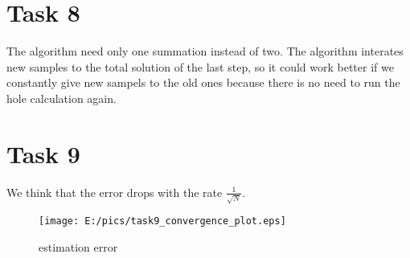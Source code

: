 \documentclass{article}
\begin{document}
\section{Task 8}
The algorithm need only one summation instead of two. The algorithm interates new samples to the total solution of the last step, so it could work better if we constantly give new sampels to the old ones because there is no need to run the hole calculation again. 

\section{Task 9}
We think that the error drops with the rate $\frac{1}{\sqrt{N}}$.
\begin{figure}[htbp]
	\centering
		\texttt{[image: E:/pics/task9\_convergence\_plot.eps]}
	\caption{estimation error}
	\label{fig:task9_convergence_plot}
\end{figure}
\end{document}
